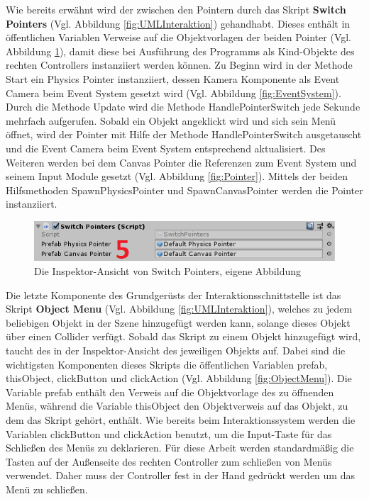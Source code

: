 \newline
Wie bereits erwähnt wird der zwischen den Pointern durch das Skript \textbf{Switch Pointers} (Vgl. Abbildung \ref{fig:UMLInteraktion}) gehandhabt. Dieses enthält in öffentlichen Variablen Verweise auf die Objektvorlagen der beiden Pointer (Vgl. Abbildung \ref{fig:SwitchPointer}), damit diese bei Ausführung des Programms als Kind-Objekte des rechten Controllers instanziiert werden können.
\newline
Zu Beginn wird in der Methode Start ein Physics Pointer instanziiert, dessen Kamera Komponente als Event Camera beim Event System gesetzt wird (Vgl. Abbildung \ref{fig:EventSystem}). Durch die Methode Update wird die Methode HandlePointerSwitch jede Sekunde mehrfach aufgerufen. Sobald ein Objekt angeklickt wird und sich sein Menü öffnet, wird der Pointer mit Hilfe der Methode HandlePointerSwitch ausgetauscht und die Event Camera beim Event System entsprechend aktualisiert. Des Weiteren werden bei dem Canvas Pointer die Referenzen zum Event System und seinem Input Module gesetzt (Vgl. Abbildung \ref{fig:Pointer}). Mittels der beiden Hilfsmethoden SpawnPhysicsPointer und SpawnCanvasPointer werden die Pointer instanziiert.
\begin{figure}[h]
	\centering
	\includegraphics[width=0.6\linewidth]{Bilder/A45_SwitchPointer2}
	\caption{Die Inspektor-Ansicht von Switch Pointers, eigene Abbildung}
	\label{fig:SwitchPointer}
\end{figure}
\newline
Die letzte Komponente des Grundgerüsts der Interaktionsschnittstelle ist das Skript \textbf{Object Menu} (Vgl. Abbildung \ref{fig:UMLInteraktion}), welches zu jedem beliebigen Objekt in der Szene hinzugefügt werden kann, solange dieses Objekt über einen Collider verfügt. Sobald das Skript zu einem Objekt hinzugefügt wird, taucht des in der Inspektor-Ansicht des jeweiligen Objekts auf. Dabei sind die wichtigsten Komponenten dieses Skripts die öffentlichen Variablen prefab, thisObject, clickButton und clickAction (Vgl. Abbildung \ref{fig:ObjectMenu}). Die Variable prefab enthält den Verweis auf die Objektvorlage des zu öffnenden Menüs, während die Variable thisObject den Objektverweis auf das Objekt, zu dem das Skript gehört, enthält. Wie bereits beim Interaktionssystem werden die Variablen clickButton und clickAction benutzt, um die Input-Taste für das Schließen des Menüs zu deklarieren. Für diese Arbeit werden standardmäßig die Tasten auf der Außenseite des rechten Controller zum schließen von Menüs verwendet. Daher muss der Controller fest in der Hand gedrückt werden um das Menü zu schließen.
